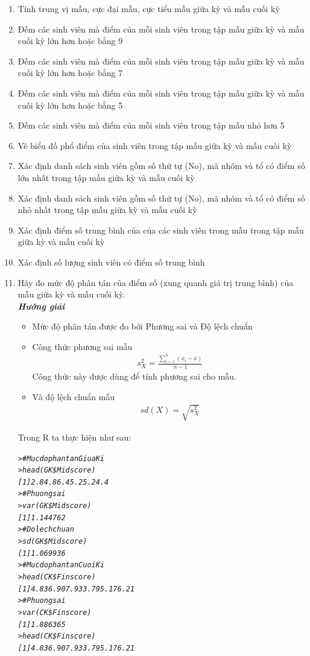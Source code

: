 \documentclass[a4paper]{article}
\theoremstyle{definition}
\begin{document}
\begin{enumerate}[1.]
\item Tính trung vị mẫu, cực đại mẫu, cực tiểu mẫu giữa kỳ và mẫu cuối kỳ
\item Đếm các sinh viên mà điểm của mỗi sinh viên trong tập mẫu giữa kỳ và mẫu cuối kỳ lớn hơn hoặc bằng 9
\item Đếm các sinh viên mà điểm của mỗi sinh viên trong tập mẫu giữa kỳ và mẫu cuối kỳ lớn hơn hoặc bằng 7
\item Đếm các sinh viên mà điểm của mỗi sinh viên trong tập mẫu giữa kỳ và mẫu cuối kỳ lớn hơn hoặc bằng 5
\item Đếm các sinh viên mà điểm của mỗi sinh viên trong tập mẫu nhỏ hơn 5
\item Vẽ biểu đồ phổ điểm của sinh viên trong tập mẫu giữa kỳ và mẫu cuối kỳ
\item Xác định danh sách sinh viên gồm số thứ tự (No), mã nhóm và tổ có điểm số lớn nhất trong tập mẫu giữa kỳ và mẫu cuối kỳ
\item Xác định danh sách sinh viên gồm số thứ tự (No), mã nhóm và tổ có điểm số nhỏ nhất trong tập mẫu giữa kỳ và mẫu cuối kỳ
\item Xác định điểm số trung bình của của các sinh viên trong mẫu trong tập mẫu giữa kỳ và mẫu cuối kỳ
\item Xác định số lượng sinh viên có điểm số trung bình 
\item Hãy đo mức độ phân tán của điểm số (xung quanh giá trị trung bình) của  mẫu giữa kỳ và mẫu cuối kỳ.
    \textbf{\textit{\\Hướng giải}}
    \begin{itemize}
    \item Mức độ phân tán được đo bởi Phương sai và Độ lệch chuẩn
    \item Công thức phương sai mẫu
    \begin{align*}
    s_X^2 = \frac{\sum\limits_{i = 1}^n {({x_i} - \overline x )}}{n - 1}
    \end{align*} 
    Công thức này được dùng để tính phương sai cho mẫu.
    \item Và độ lệch chuẩn mẫu 
    \begin{align*}
        sd(X)=\sqrt{s_X^2}
    \end{align*}
    \end{itemize}
    Trong R ta thực hiện như sau:
    \begin{mdframed}[backgroundcolor=magenta!10]
    \begin{alltt}
    \textit{
> #Muc do phan tan Giua Ki
> head(GK\$Midscore)
[1] 2.8 4.8 6.4 5.2 5.2 4.4
> #Phuong sai
> var(GK\$Midscore)
[1] 1.144762
> #Do lech chuan
> sd(GK\$Midscore)
[1] 1.069936
> #Muc do phan tan Cuoi Ki
> head(CK\$Finscore)
[1] 4.83 6.90 7.93 3.79 5.17 6.21
> #Phuong sai
> var(CK\$Finscore)
[1] 1.886365
> head(CK\$Finscore)
[1] 4.83 6.90 7.93 3.79 5.17 6.21
}
    \end{alltt}
    \end{mdframed}
                

\end{enumerate}
\end{document}
